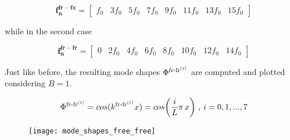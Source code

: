 \documentclass[a4paper,12pt,oneside]{article}
\begin{document}
\[
	\mathbf{f_n^{fr-fx}} =	\begin{bmatrix}
														f_0	& 3f_0	& 5f_0	& 7f_0	& 9f_0	& 11f_0	& 13f_0	& 15f_0
													\end{bmatrix}
\]

while in the second case

\[
	\mathbf{f_n^{fr-fr}} =	\begin{bmatrix}
														0	& 2f_0	& 4f_0	& 6f_0	& 8f_0	& 10f_0	& 12f_0	& 14f_0
													\end{bmatrix}
\]

Just like before, the resulting mode shapes $ \Phi^{\textup{fr-fr}^{(i)}} $ are computed and plotted considering $ B = 1 $.

\[
	\Phi^{\textup{fr-fr}^{(i)}} = cos(k^{\textup{fr-fr}^{(i)}} x) = %
		cos\biggl(\frac{i}{L} \pi \, x\biggr) ~ \text{,} ~ i = 0,1,...,7
\]

\begin{figure}[h]
	\centering
	\texttt{[image: mode\_shapes\_free\_free]}
\end{figure}
\end{document}

